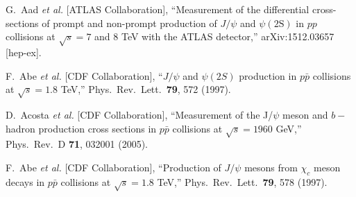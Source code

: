 \documentclass[aps,prc,preprint,superscriptaddress,showpacs,showkeys,amsmath]{revtex4-1}
\begin{document}
\begin{thebibliography}{100}
  G.~Aad {\it et al.} [ATLAS Collaboration],
  ``Measurement of the differential cross-sections of prompt and non-prompt production of $J/\psi$ 
  and $\psi(2\mathrm{S})$ in $pp$ collisions at $\sqrt{s} = 7$ and $8$ TeV with the ATLAS detector,''
  arXiv:1512.03657 [hep-ex].


  F.~Abe {\it et al.} [CDF Collaboration],
  ``$J/\psi$ and $\psi(2S)$ production in $p\bar{p}$ collisions at $\sqrt{s} = 1.8$ TeV,''
  Phys.\ Rev.\ Lett.\  {\bf 79}, 572 (1997).
  

  D.~Acosta {\it et al.}  [CDF Collaboration],
  ``Measurement of the J/$\psi$ meson and $b-$hadron production cross sections in $p\bar{p}$ collisions at $\sqrt{s} = 1960$ GeV,''
  Phys.\ Rev.\ D {\bf 71}, 032001 (2005).


  F.~Abe {\it et al.} [CDF Collaboration],
  ``Production of $J/\psi$ mesons from $\chi_c$ meson decays in $p\bar{p}$ collisions at $\sqrt{s} = 1.8$ TeV,''
  Phys.\ Rev.\ Lett.\  {\bf 79}, 578 (1997).














\end{thebibliography}
\end{document}
